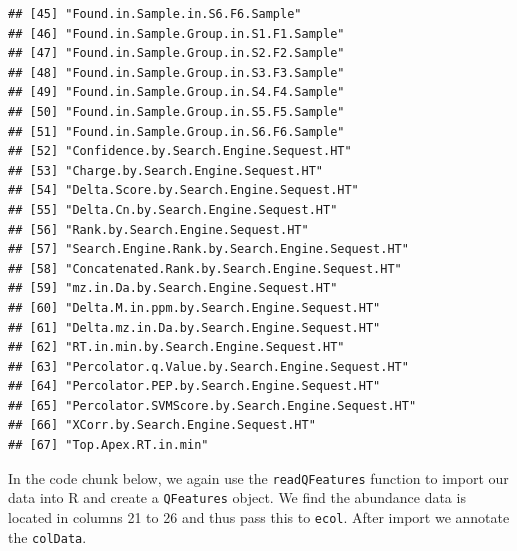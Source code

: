 \documentclass[9pt,a4paper,]{extarticle}
\begin{document}
\begin{verbatim}
## [45] "Found.in.Sample.in.S6.F6.Sample"                
## [46] "Found.in.Sample.Group.in.S1.F1.Sample"          
## [47] "Found.in.Sample.Group.in.S2.F2.Sample"          
## [48] "Found.in.Sample.Group.in.S3.F3.Sample"          
## [49] "Found.in.Sample.Group.in.S4.F4.Sample"          
## [50] "Found.in.Sample.Group.in.S5.F5.Sample"          
## [51] "Found.in.Sample.Group.in.S6.F6.Sample"          
## [52] "Confidence.by.Search.Engine.Sequest.HT"         
## [53] "Charge.by.Search.Engine.Sequest.HT"             
## [54] "Delta.Score.by.Search.Engine.Sequest.HT"        
## [55] "Delta.Cn.by.Search.Engine.Sequest.HT"           
## [56] "Rank.by.Search.Engine.Sequest.HT"               
## [57] "Search.Engine.Rank.by.Search.Engine.Sequest.HT" 
## [58] "Concatenated.Rank.by.Search.Engine.Sequest.HT"  
## [59] "mz.in.Da.by.Search.Engine.Sequest.HT"           
## [60] "Delta.M.in.ppm.by.Search.Engine.Sequest.HT"     
## [61] "Delta.mz.in.Da.by.Search.Engine.Sequest.HT"     
## [62] "RT.in.min.by.Search.Engine.Sequest.HT"          
## [63] "Percolator.q.Value.by.Search.Engine.Sequest.HT" 
## [64] "Percolator.PEP.by.Search.Engine.Sequest.HT"     
## [65] "Percolator.SVMScore.by.Search.Engine.Sequest.HT"
## [66] "XCorr.by.Search.Engine.Sequest.HT"              
## [67] "Top.Apex.RT.in.min"
\end{verbatim}

In the code chunk below, we again use the \texttt{readQFeatures} function to import our
data into R and create a \texttt{QFeatures} object. We find the abundance data is
located in columns 21 to 26 and thus pass this to \texttt{ecol}. After import we
annotate the \texttt{colData}.
\end{document}
